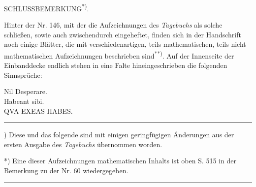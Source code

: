 \bigskip
\begin{center}SCHLUSSBEMERKUNG\textsuperscript{*)}.\end{center}
\begingroup\small
\indent Hinter der Nr. 146, mit der die Aufzeichnungen des \textit{Tagebuchs} als solche schließen, sowie auch zwischendurch eingeheftet, finden sich in der Handschrift noch einige Blätter, die mit verschiedenartigen, teils mathematischen, teils nicht mathematischen Aufzeichnungen beschrieben sind\textsuperscript{**)}. Auf der Innenseite der Einbanddecke endlich stehen in eine Falte hineingeschrieben die folgenden Sinnsprüche:
\par\endgroup
\begin{center}
Nil Desperare.\\[.5\baselineskip]
Habeant sibi.\\[.5\baselineskip]
QVA EXEAS HABES.
\end{center}
\noindent\rule{.25\linewidth}{.3pt}
\begingroup\footnotesize
\par\indent *) Diese  und das folgende  sind mit einigen geringfügigen Änderungen aus der ersten Ausgabe des \textit{Tagebuchs} übernommen worden.
\par\indent **) Eine dieser Aufzeichnungen mathematischen Inhalts ist oben S. 515 in der Bemerkung zu der Nr. 60 wiedergegeben.
\par\endgroup
\begin{center}\rule{.18\linewidth}{.3pt}\end{center}
